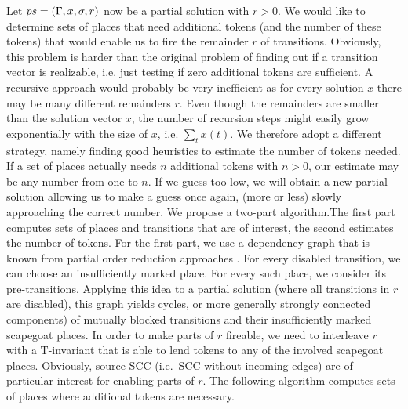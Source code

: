 \documentclass{LMCS}
\begin{document}
Let $ps=({\Gamma},x,\sigma,r)$ now be a partial solution with $r>0$. We would like to determine sets of places that need additional tokens
(and the number of these tokens) that would enable us to fire the remainder $r$ of transitions. Obviously, this problem is harder
than the original problem of finding out if a transition vector is realizable, i.e. just testing if zero additional tokens are
sufficient. A recursive approach would probably be very inefficient as for every solution $x$ there may be many different remainders $r$.
Even though the remainders are smaller than the solution vector $x$, the number of recursion steps might easily grow exponentially with
the size of $x$, i.e. $\sum_tx(t)$. We therefore adopt a different strategy, namely finding good heuristics to estimate the number of
tokens needed. If a set of places actually needs $n$ additional tokens with $n>0$, our estimate may be any number from one to $n$.
If we guess too low, we will obtain a new partial solution allowing us to make a guess once again, (more or less) slowly approaching
the correct number. We propose a two-part algorithm.The first part computes sets of places and transitions that are of interest, the second
estimates the number of tokens. For the first part, we use a dependency graph that is known from partial order reduction approaches \cite{valmari2009}.
For every disabled transition, we can choose an insufficiently marked place. For every such place, we consider its pre-transitions. Applying this
idea to a partial solution (where all transitions in $r$ are disabled), this graph yields cycles, or more generally strongly connected components) of mutually blocked 
transitions and their insufficiently marked scapegoat places. In order to make parts of $r$ fireable, we need to interleave $r$ with a T-invariant that
is able to lend tokens to any of the involved scapegoat places. Obviously, source SCC (i.e.~SCC without incoming edges) are of particular
interest for enabling parts of $r$. The following algorithm computes sets of places where additional tokens are necessary.
\end{document}
